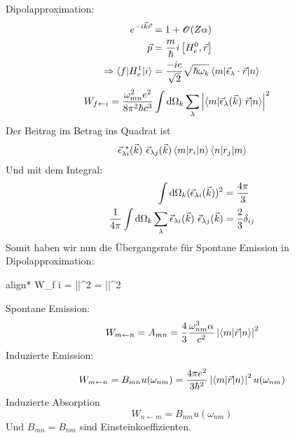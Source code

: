 	Dipolapproximation:
		\begin{align*}
			e^{-i \vec{k} \vec{r}} &= 1 + \mathscr{O} (Z\alpha) \\
			\vec{p} &= \frac{m}{\hbar} i \left[H_e^0, \vec{r}\right] \\
			\Rightarrow 
			\braket{f | H_e^1 | i} &= 
			\frac{-i e}{\sqrt{2}} \sqrt{\hbar \omega_k} 
			\braket{m | \vec{\epsilon}_\lambda \cdot \vec{r}| n}
		\end{align*}
		\begin{align*}
			W_{f \leftarrow i} &= \frac{\omega_{mn}^2 e^2}{8 \pi^2 \hbar c^3}
			\int \mathrm{d} \Omega_k \sum_\lambda \left|\braket{m | \vec{\epsilon}_\lambda (\vec{k}) ~\vec{r} | n}\right|^2
		\end{align*}
	Der Beitrag im Betrag ins Quadrat ist
		\begin{align*}
			\vec{\epsilon}_{\lambda i}^{~*} (\vec{k}) ~\vec{\epsilon}_{\lambda j} (\vec{k}) 
			\braket{m | r_i | n} \braket{n | r_j | m}
		\end{align*}
	Und mit dem Integral:
		\begin{align*}
			\int \mathrm{d} \Omega_k (\vec{\epsilon}_{\lambda i}(\vec{k}))^2 &= \frac{4 \pi}{3} \\
			\frac{1}{4 \pi} \int \mathrm{d} \Omega_k \sum_\lambda 
			\vec{\epsilon}_{\lambda i} (\vec{k}) ~\vec{\epsilon}_{\lambda j} (\vec{k}) 
			&= \frac{2}{3} \delta_{ij}
		\end{align*}
	Somit haben wir nun die Übergangsrate für Spontane Emission in Dipolapproximation:
		\begin{empheq}[box=\boxed]{align*}
			W_{f \leftarrow i} = 
			\left|\right|^2 
			=  
			\left|\right|^2
		\end{empheq}
	Spontane Emission:
		\begin{equation*}
			W_{m \leftarrow n} = A_{mn} = \frac{4}{3} \frac{\omega_{nm}^3 \alpha}{c^2}
			\left|\braket{m | \vec{r} | n}\right|^2
		\end{equation*}
	Induzierte Emission:
		\begin{equation*}
			W_{m \leftarrow n} = B_{mn} u (\omega_{nm})
			= \frac{4 \pi e^2}{3 \hbar^2} \left|\braket{m | \vec{r} | n}\right|^2
			u (\omega_{nm})
		\end{equation*}
	Induzierte Absorption
		\begin{equation*}
			W_{n \leftarrow m} = B_{nm} u(\omega_{nm})
		\end{equation*}
	Und $B_{mn} = B_{nm}$ sind Einsteinkoeffizienten.
	
